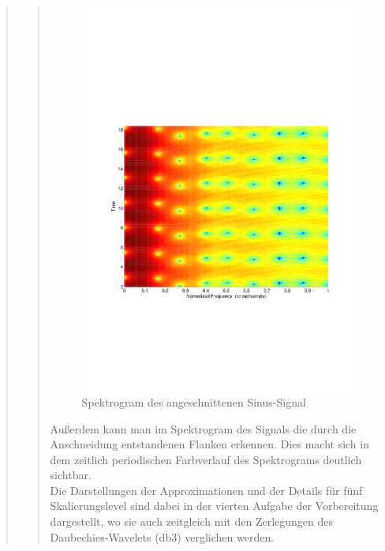 \begin{quote}
\begin{quote}
        
        \begin{figure}[H]
                    \centering
                        \includegraphics[scale=0.5, trim = 1cm 7cm 1.5cm 8cm,
                        clip]{./Bilder/Termin8/Spectrogam}
                        \caption{Spektrogram des angeschnittenen Sinus-Signal}
                    \end{figure} 
        
        
        Außerdem kann man im Spektrogram des Signals die durch die Anschneidung
        entstandenen Flanken erkennen. Dies macht sich in dem zeitlich periodischen
        Farbverlauf des Spektrograms deutlich sichtbar.\\
        
        Die Darstellungen der Approximationen und der Details für fünf
        Skalierungslevel sind dabei in der vierten Aufgabe der Vorbereitung
        dargestellt, wo sie auch zeitgleich mit den Zerlegungen des
        Daubechies-Wavelets (db3) verglichen werden.
        

\end{quote}
\end{quote}
